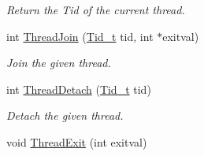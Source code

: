 \begin{DoxyCompactItemize}
\begin{DoxyCompactList}\small\item\em Return the Tid of the current thread. \end{DoxyCompactList}\item 
int \hyperlink{group__syscalls_ga9ffbb344eb33487ceef5442846a74be0}{Thread\+Join} (\hyperlink{group__syscalls_gaf67ad1c55e6b2a79bf8a99106380ce01}{Tid\+\_\+t} tid, int $\ast$exitval)
\begin{DoxyCompactList}\small\item\em Join the given thread. \end{DoxyCompactList}\item 
int \hyperlink{group__syscalls_ga5f957d985678728a418ff70a617fab4d}{Thread\+Detach} (\hyperlink{group__syscalls_gaf67ad1c55e6b2a79bf8a99106380ce01}{Tid\+\_\+t} tid)
\begin{DoxyCompactList}\small\item\em Detach the given thread. \end{DoxyCompactList}\item 
void \hyperlink{group__syscalls_gab77e59bf31165db88a22ac8f031b8741}{Thread\+Exit} (int exitval)\hypertarget{group__syscalls_gab77e59bf31165db88a22ac8f031b8741}{}\label{group__syscalls_gab77e59bf31165db88a22ac8f031b8741}


\end{DoxyCompactItemize}

